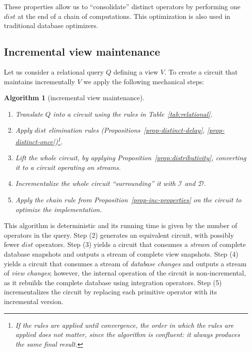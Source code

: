 \documentclass[twocolumn
]{svjour3}
\numberwithin{equation}{section}
\newtheorem{algorithm}{Algorithm}
\newcommand{\I}{\mathcal{I}}  %
\newcommand{\D}{\mathcal{D}}  %
\newcommand{\I}{\mathit{I}}  %
\newcommand{\D}{\mathit{D}}  %
\newcommand{\distinct}{\mathit{dist}}  %
\begin{document}
These properties allow us to ``consolidate'' distinct operators by
performing one $\distinct$ at the end of a chain of computations.
This optimization is also used in traditional database optimizers.

\vspace{-3ex}
\subsection{Incremental view maintenance}\label{sec:ivm}

Let us consider a relational query $Q$ defining a view $V$.  To create
a circuit that maintains incrementally $V$ we apply the following
mechanical steps:

\begin{algorithm}[incremental view maintenance]
  \label{algorithm-inc}\quad
\begin{enumerate}[nosep, leftmargin=\parindent]
    \item Translate $Q$ into a circuit using the rules in Table~\ref{tab:relational}.
    \item Apply $\distinct$ elimination rules
      (Propositions~\ref{prop-distinct-delay},
      \ref{prop-distinct-once})\footnote{If the rules are applied
      until convergence, the order in which the rules
      are applied does not matter, since the algorithm is confluent:
      it always produces the same final result.}.
    \item Lift the whole circuit, by applying Proposition~\ref{prop:distributivity},
    converting it to a circuit operating on streams.
    \item Incrementalize the whole circuit ``surrounding'' it with $\I$ and $\D$.
    \item Apply the chain rule from
      Proposition~\ref{prop-inc-properties} on the circuit to optimize
      the implementation.
\end{enumerate}
\end{algorithm}

This algorithm is deterministic and its running time
is given by the number of operators in the query.
Step (2) generates an equivalent circuit, with possibly fewer
$\distinct$ operators.  Step (3) yields a circuit that consumes a
\emph{stream} of complete database snapshots and outputs a stream of
complete view snapshots. Step (4) yields a circuit that consumes a
stream of \emph{database changes} and outputs a stream of \emph{view
changes}; however, the internal operation of the circuit is
non-incremental, as it rebuilds the complete database using
integration operators.  Step (5) incrementalizes the circuit by
replacing each primitive operator with its incremental version.
\end{document}
